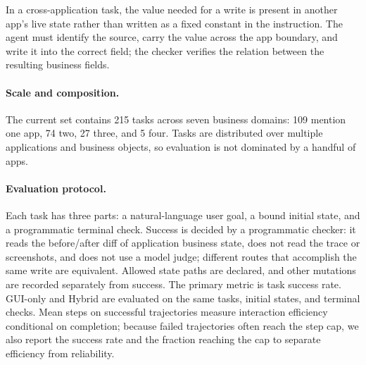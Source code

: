 In a cross-application task, the value needed for a write is present in another app's live state rather than written as a fixed constant in the instruction. The agent must identify the source, carry the value across the app boundary, and write it into the correct field; the checker verifies the relation between the resulting business fields.

\paragraph{Scale and composition.}
The current set contains 215 tasks across seven business domains: 109 mention one app, 74 two, 27 three, and 5 four. Tasks are distributed over multiple applications and business objects, so evaluation is not dominated by a handful of apps.

\paragraph{Evaluation protocol.}
Each task has three parts: a natural-language user goal, a bound initial state, and a programmatic terminal check. Success is decided by a programmatic checker: it reads the before/after diff of application business state, does not read the trace or screenshots, and does not use a model judge; different routes that accomplish the same write are equivalent. Allowed state paths are declared, and other mutations are recorded separately from success. The primary metric is task success rate. GUI-only and Hybrid are evaluated on the same tasks, initial states, and terminal checks. Mean steps on successful trajectories measure interaction efficiency conditional on completion; because failed trajectories often reach the step cap, we also report the success rate and the fraction reaching the cap to separate efficiency from reliability.
